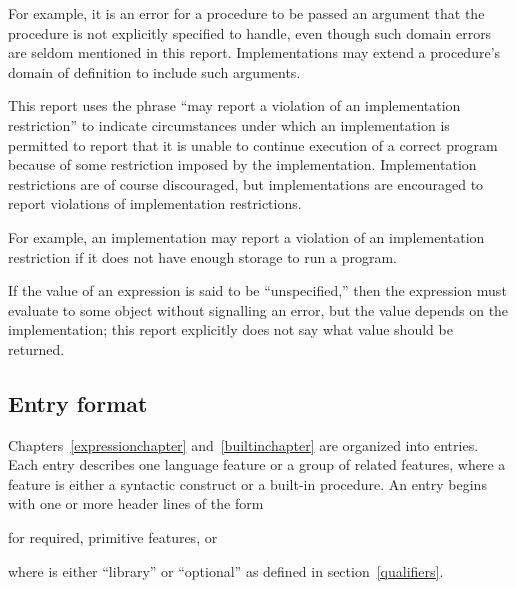 \vest For example, it is an error for a procedure to be passed an argument that
the procedure is not explicitly specified to handle, even though such
domain errors are seldom mentioned in this report.  Implementations may
extend a procedure's domain of definition to include such arguments.

\vest This report uses the phrase ``may report a violation of an
implementation restriction'' to indicate circumstances under which an
implementation is permitted to report that it is unable to continue
execution of a correct program because of some restriction imposed by the
implementation.  Implementation restrictions are of course discouraged,
but implementations are encouraged to report violations of implementation
restrictions.

\vest For example, an implementation may report a violation of an
implementation restriction if it does not have enough storage to run a
program.

\vest If the value of an expression is said to be ``unspecified,'' then
the expression must evaluate to some object without signalling an error,
but the value depends on the implementation; this report explicitly does
not say what value should be returned. 




\subsection{Entry format}

Chapters~\ref{expressionchapter} and~\ref{builtinchapter} are organized
into entries.  Each entry describes one language feature or a group of
related features, where a feature is either a syntactic construct or a
built-in procedure.  An entry begins with one or more header lines of the form

\noindent{}\unpenalty

for required, primitive features, or

\noindent{}\unpenalty

where  is either ``library'' or ``optional'' as defined
 in section~\ref{qualifiers}.

